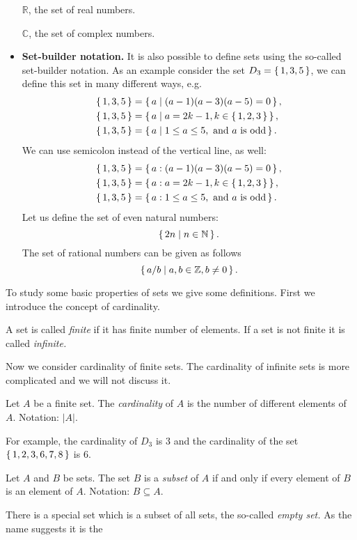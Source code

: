 \begin{itemize}
$\mathbb{R}$, the set of real numbers.

$\mathbb{C}$, the set of complex numbers.
\item \textbf{Set-builder notation.} It is also possible to define sets using the so-called set-builder notation.
As an example consider the set $D_3=\left\{\,1,3,5\,\right\}$, we can define this set in many different ways, e.g.\
\begin{align*}
\left\{\,1,3,5\,\right\}&=\left\{\,a\mid (a-1)(a-3)(a-5)=0\,\right\}, \\
\left\{\,1,3,5\,\right\}&=\left\{\,a\mid a=2k-1, k\in\left\{\,1,2,3\,\right\}\,\right\}, \\
\left\{\,1,3,5\,\right\}&=\left\{\,a\mid 1\leq a\leq 5, \mbox{ and $a$ is odd}\,\right\}.
\end{align*}
We can use semicolon instead of the vertical line, as well: 
\begin{align*}
\left\{\,1,3,5\,\right\}&=\left\{\,a:(a-1)(a-3)(a-5)=0\,\right\}, \\
\left\{\,1,3,5\,\right\}&=\left\{\,a:a=2k-1, k\in\left\{\,1,2,3\,\right\}\,\right\}, \\
\left\{\,1,3,5\,\right\}&=\left\{\,a:1\leq a\leq 5, \mbox{ and $a$ is odd}\,\right\}.
\end{align*}
Let us define the set of even natural numbers: 
\[
\left\{\,2n\mid n\in\mathbb{N}\,\right\}.
\]
The set of rational numbers can be given as follows
\[
\left\{\,a/b\mid a,b\in\mathbb{Z}, b\neq 0\,\right\}.
\]
\end{itemize}
To study some basic properties of sets we give some definitions. First we introduce the concept of cardinality.
\begin{definition}
A set is called \emph{finite} if it has finite number of elements. If a set is not finite it is called \emph{infinite.}
\end{definition}
Now we consider cardinality of finite sets. The cardinality of infinite sets is more complicated and we will not 
discuss it.
\begin{definition}
Let $A$ be a finite set. The \emph{cardinality} of $A$ is the number of different elements of $A$. Notation: $|A|$.
\end{definition}
For example, the cardinality of $D_3$ is 3 and the cardinality of the set $\left\{\,1,2,3,6,7,8\,\right\}$ is 6.
\begin{definition}
Let $A$ and $B$ be sets. The set $B$ is a \emph{subset} of $A$ if and only if every element of $B$ is an element of $A$.
Notation: $B\subseteq A$.
\end{definition}
There is a special set which is a subset of all sets, the so-called \emph{empty set.} As the name suggests it is the
